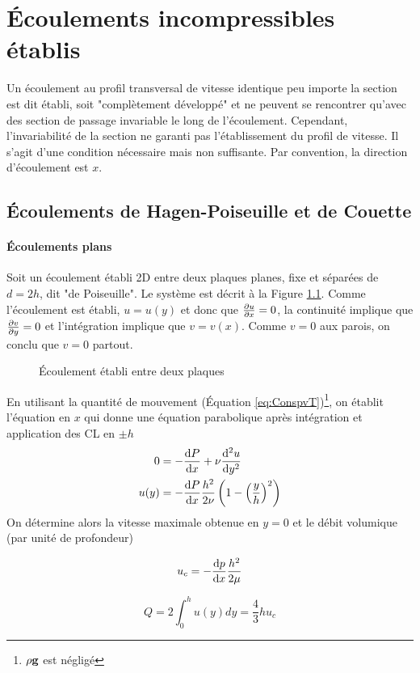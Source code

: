 
\chapter{Écoulements incompressibles établis}
  Un écoulement au profil transversal de vitesse identique peu importe la section est dit établi, soit "complètement développé" et ne peuvent se rencontrer qu'avec des section de passage invariable le long de l'écoulement. Cependant, l'invariabilité de la section ne garanti pas l'établissement du profil de vitesse. Il s'agit d'une condition nécessaire mais non suffisante. Par convention, la direction d'écoulement est $x$.

  \section{Écoulements de Hagen-Poiseuille et de Couette}
      \subsubsection{Écoulements plans}
        Soit un écoulement établi 2D entre deux plaques planes, fixe et séparées de $d=2h$, dit "de Poiseuille". Le système est décrit à la Figure \ref{fig:Poiseuille}. Comme l'écoulement est établi, $u=u(y)$ et donc que $\pdv{u}{x} = 0$, la continuité implique que $\pdv{v}{y} = 0$ et l'intégration implique que $v = v(x)$. Comme $v=0$ aux parois, on conclu que $v = 0$ partout.
        \begin{figure}[h]
          \centering
          
          \caption{Écoulement établi entre deux plaques}
          \label{fig:Poiseuille}
        \end{figure}

        En utilisant la quantité de mouvement (Équation \ref{eq:ConspvT})\footnote{$\rho \vb{g}$ est négligé}, on établit l'équation en $x$ qui donne une équation parabolique après intégration et application des CL en $\pm h$
        \begin{equation}
          \begin{aligned}
            0 &= -\dv{P}{x} + \nu\dv[2]{u}{y} \\ \label{eq:Poiseuille}
            u(y) &= -\dv{P}{x}\frac{h^2}{2\nu} \left(1 - \left(\frac{y}{h}\right)^2\right)
          \end{aligned}
        \end{equation}
        On détermine alors la vitesse maximale obtenue en $y = 0$ et le débit volumique (par unité de profondeur)
        \begin{multicols}{2}
          \begin{equation}
            u_c = -\dv{p}{x} \frac{h^2}{2\mu}
          \end{equation}

          \begin{equation}
            Q = 2\int_0^h u(y)dy = \frac{4}{3} h u_c
          \end{equation}
        \end{multicols}

